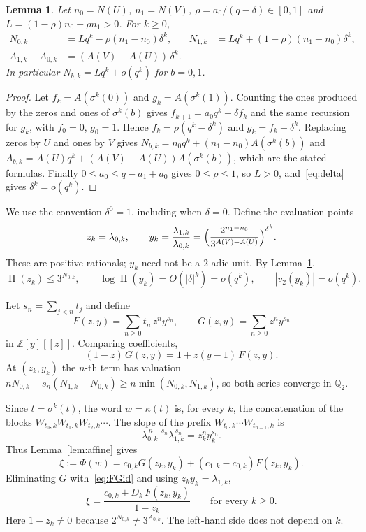 \documentclass[11pt]{amsart}
\newtheorem{lemma}[theorem]{Lemma}
\theoremstyle{remark}
\theoremstyle{definition}
\numberwithin{equation}{section}
\newcommand{\Q}{\mathbb{Q}}
\newcommand{\Z}{\mathbb{Z}}
\newcommand{\Ht}{\operatorname{H}}
\newcommand{\vt}{v_2}
\begin{document}
\begin{lemma}\label{lem:counts}
Let $n_0=N(U)$, $n_1=N(V)$, $\rho=a_0/(q-\delta)\in[0,1]$ and $L=(1-\rho)n_0+\rho n_1>0$. For $k\ge0$,
\begin{align*}
N_{0,k}&=Lq^k-\rho(n_1-n_0)\delta^k, &
N_{1,k}&=Lq^k+(1-\rho)(n_1-n_0)\delta^k, \\
A_{1,k}-A_{0,k}&=(A(V)-A(U))\,\delta^k . &&
\end{align*}
In particular $N_{b,k}=Lq^k+o(q^k)$ for $b=0,1$.
\end{lemma}

\begin{proof}
Let $f_k=A(\sigma^k(0))$ and $g_k=A(\sigma^k(1))$. Counting the ones produced by the zeros and ones of $\sigma^k(b)$ gives $f_{k+1}=a_0q^k+\delta f_k$ and the same recursion for $g_k$, with $f_0=0$, $g_0=1$. Hence $f_k=\rho(q^k-\delta^k)$ and $g_k=f_k+\delta^k$. Replacing zeros by $U$ and ones by $V$ gives $N_{b,k}=n_0q^k+(n_1-n_0)A(\sigma^k(b))$ and $A_{b,k}=A(U)q^k+(A(V)-A(U))A(\sigma^k(b))$, which are the stated formulas. Finally $0\le a_0\le q-a_1+a_0$ gives $0\le\rho\le1$, so $L>0$, and~\eqref{eq:delta} gives $\delta^k=o(q^k)$.
\end{proof}

We use the convention $\delta^0=1$, including when $\delta=0$. Define the evaluation points
\begin{equation}\label{eq:zy}
z_k=\lambda_{0,k},\qquad y_k=\frac{\lambda_{1,k}}{\lambda_{0,k}}=\Bigl(\frac{2^{n_1-n_0}}{3^{A(V)-A(U)}}\Bigr)^{\delta^k}.
\end{equation}
These are positive rationals; $y_k$ need not be a $2$-adic unit. By Lemma~\ref{lem:counts},
\begin{equation}\label{eq:smallheight}
\Ht(z_k)\le3^{N_{0,k}},\qquad \log\Ht(y_k)=O(|\delta|^k)=o(q^k),\qquad |\vt(y_k)|=o(q^k).
\end{equation}

Let $s_n=\sum_{j<n}t_j$ and define
\begin{equation}\label{eq:FG}
F(z,y)=\sum_{n\ge0}t_n\,z^ny^{s_n},\qquad G(z,y)=\sum_{n\ge0}z^ny^{s_n}
\end{equation}
in $\Z[y][[z]]$. Comparing coefficients,
\begin{equation}\label{eq:FGid}
(1-z)\,G(z,y)=1+z(y-1)\,F(z,y).
\end{equation}
At $(z_k,y_k)$ the $n$-th term has valuation $nN_{0,k}+s_n(N_{1,k}-N_{0,k})\ge n\min(N_{0,k},N_{1,k})$, so both series converge in $\Q_2$.

Since $t=\sigma^k(t)$, the word $w=\kappa(t)$ is, for every $k$, the concatenation of the blocks $W_{t_0,k}W_{t_1,k}W_{t_2,k}\cdots$. The slope of the prefix $W_{t_0,k}\cdots W_{t_{n-1},k}$ is
\[\lambda_{0,k}^{\,n-s_n}\lambda_{1,k}^{\,s_n}=z_k^ny_k^{s_n}.\]
Thus Lemma~\ref{lem:affine} gives
\[\xi:=\Phi(w)=c_{0,k}G(z_k,y_k)+(c_{1,k}-c_{0,k})F(z_k,y_k).\]
 Eliminating $G$ with~\eqref{eq:FGid} and using $z_ky_k=\lambda_{1,k}$,
\begin{equation}\label{eq:seedF}
\xi=\frac{c_{0,k}+D_k\,F(z_k,y_k)}{1-z_k}\qquad\text{for every }k\ge0 .
\end{equation}
Here $1-z_k\ne0$ because $2^{N_{0,k}}\ne3^{A_{0,k}}$. The left-hand side does not depend on $k$.
\end{document}
